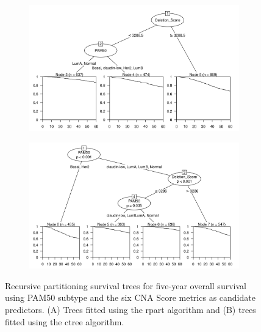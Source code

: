 \begin{figure}[!htb]
\centering

\vspace{0.5cm}

\begin{subfigure}{\textwidth}
\subcaption{}
\includegraphics[width=1\textwidth]{../figures/Appendices/Appendix_B/PartyKit_Survival_Score_FiveYearOS_PAM50.png}
\end{subfigure}

\vspace{2cm}

\begin{subfigure}{\textwidth}
\subcaption{}
\includegraphics[width=1\textwidth]{../figures/Appendices/Appendix_B/Ctree_Survival_Score_FiveYearOS_PAM50.png}
\end{subfigure}

\vspace{0.5cm}

\caption[Recursive partitioning survival trees for five-year overall survival using PAM50 subtype and the six CNA Score metrics as candidate predictors.]{Recursive partitioning survival trees for five-year overall survival using PAM50 subtype and the six CNA Score metrics as candidate predictors. (A) Trees fitted using the rpart algorithm and (B) trees fitted using the ctree algorithm.}
\end{figure}

